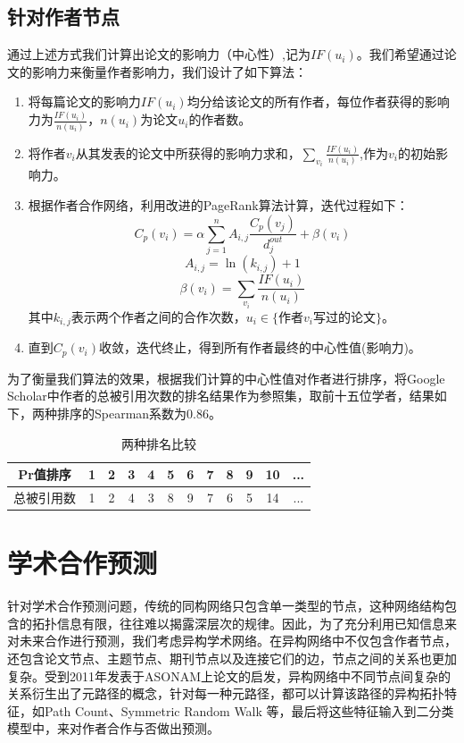 \documentclass{bmvc2k}
\begin{document}
\subsection {针对作者节点}
通过上述方式我们计算出论文的影响力（中心性）,记为$IF(u_i)$。我们希望通过论文的影响力来衡量作者影响力，我们设计了如下算法：
\begin{enumerate}
\item 将每篇论文的影响力$IF(u_i)$均分给该论文的所有作者，每位作者获得的影响力为$\frac{IF(u_i)}{n(u_i)}$，$n(u_i)$为论文$u_i$的作者数。
\item 将作者$v_i$从其发表的论文中所获得的影响力求和，$\sum_{v_i}\frac{IF(u_i)}{n(u_i)} $,作为$v_i$的初始影响力。
\item 根据作者合作网络，利用改进的PageRank算法计算，迭代过程如下：
\[ C_p(v_i) = \alpha\sum_{j=1}^{n}A_{i,j}\frac{C_p(v_j)}{d_j^{out}}+\beta(v_i) \]
\[ A_{i,j} = \ln(k_{i,j}) + 1 \]
\[ \beta(v_i) = \sum_{v_i}\frac{IF(u_i)}{n(u_i)} \]
其中$k_{i,j}$表示两个作者之间的合作次数，$u_i \in \{$作者$v_i$写过的论文$\}$。
\item 直到$ C_p(v_i)$收敛，迭代终止，得到所有作者最终的中心性值(影响力)。
\end{enumerate}
为了衡量我们算法的效果，根据我们计算的中心性值对作者进行排序，将Google Scholar中作者的总被引用次数的排名结果作为参照集，取前十五位学者，结果如下，两种排序的Spearman系数为0.86。
\begin{table}[h]
\begin{center}
\begin{tabular}{|c|c|c|c|c|c|c|c|c|c|c|c| } 
	\hline 
	Pr值排序 &1 &2 &3 &4 &5 &6  &7 &8 &9 &10 & ... \\ 
	\hline
	总被引用数& 1 &2 &4 &3 &8 &9 &7 &6 &5 &14 &...\\ 
	\hline 
\end{tabular} 
\end{center}
\caption{两种排名比较}
\end{table}

\section{ 学术合作预测}
针对学术合作预测问题，传统的同构网络只包含单一类型的节点，这种网络结构包含的拓扑信息有限，往往难以揭露深层次的规律。因此，为了充分利用已知信息来对未来合作进行预测，我们考虑异构学术网络。在异构网络中不仅包含作者节点，还包含论文节点、主题节点、期刊节点以及连接它们的边，节点之间的关系也更加复杂。受到2011年发表于ASONAM上论文的启发，异构网络中不同节点间复杂的关系衍生出了元路径的概念，针对每一种元路径，都可以计算该路径的异构拓扑特征，如Path Count、Symmetric Random Walk
等，最后将这些特征输入到二分类模型中，来对作者合作与否做出预测。
\end{document}
